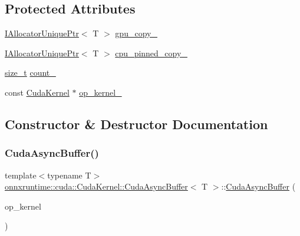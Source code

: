 \subsection*{Protected Attributes}
\begin{DoxyCompactItemize}
\item 
\mbox{\hyperlink{namespaceonnxruntime_a323aace024f171700e4b07b299a178e7}{I\+Allocator\+Unique\+Ptr}}$<$ T $>$ \mbox{\hyperlink{classonnxruntime_1_1cuda_1_1CudaKernel_1_1CudaAsyncBuffer_a94d646cb39fe7b7585e0dc84eb8d249c}{gpu\+\_\+copy\+\_\+}}
\item 
\mbox{\hyperlink{namespaceonnxruntime_a323aace024f171700e4b07b299a178e7}{I\+Allocator\+Unique\+Ptr}}$<$ T $>$ \mbox{\hyperlink{classonnxruntime_1_1cuda_1_1CudaKernel_1_1CudaAsyncBuffer_a03b71ae647ad6715ce39706a5fe412c2}{cpu\+\_\+pinned\+\_\+copy\+\_\+}}
\item 
\mbox{\hyperlink{mlasi_8h_a503efbc1c6e50825320ad909366b78ab}{size\+\_\+t}} \mbox{\hyperlink{classonnxruntime_1_1cuda_1_1CudaKernel_1_1CudaAsyncBuffer_a3f4bf80262e6dbf7e993948d5e899aa0}{count\+\_\+}}
\item 
const \mbox{\hyperlink{classonnxruntime_1_1cuda_1_1CudaKernel}{Cuda\+Kernel}} $\ast$ \mbox{\hyperlink{classonnxruntime_1_1cuda_1_1CudaKernel_1_1CudaAsyncBuffer_af1dd8b6408d512cc9ec0c5173647acad}{op\+\_\+kernel\+\_\+}}
\end{DoxyCompactItemize}


\subsection{Constructor \& Destructor Documentation}
\mbox{\label{classonnxruntime_1_1cuda_1_1CudaKernel_1_1CudaAsyncBuffer_a47503e3ac7f13180576bc5162c4a0144}} 
\subsubsection{\texorpdfstring{Cuda\+Async\+Buffer()}{CudaAsyncBuffer()}\hspace{0.1cm}{\footnotesize\ttfamily [1/4]}}
{\footnotesize\ttfamily template$<$typename T$>$ \\
\mbox{\hyperlink{classonnxruntime_1_1cuda_1_1CudaKernel_1_1CudaAsyncBuffer}{onnxruntime\+::cuda\+::\+Cuda\+Kernel\+::\+Cuda\+Async\+Buffer}}$<$ T $>$\+::\mbox{\hyperlink{classonnxruntime_1_1cuda_1_1CudaKernel_1_1CudaAsyncBuffer}{Cuda\+Async\+Buffer}} (\begin{DoxyParamCaption}\item[{const \mbox{\hyperlink{classonnxruntime_1_1cuda_1_1CudaKernel}{Cuda\+Kernel}} $\ast$}]{op\+\_\+kernel }\end{DoxyParamCaption})\hspace{0.3cm}{\ttfamily [inline]}}

